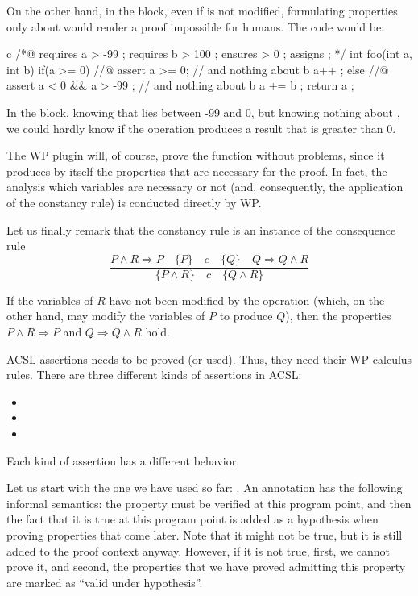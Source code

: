 On the other hand, in the  block, even if  is
not modified, formulating properties only about  would render
a proof impossible for humans. The code would be:



\begin{CodeBlock}{c}
/*@
  requires a > -99 ;
  requires b > 100 ;
  ensures  \result > 0 ;
  assigns  \nothing ;
*/
int foo(int a, int b){
  if(a >= 0){
    //@ assert a >= 0; // and nothing about b
    a++ ;
  } else {
    //@ assert a < 0 && a > -99 ; // and nothing about b
    a += b ;
  }
  return a ;
}
\end{CodeBlock}



In the  block, knowing that lies between -99 and
0, but knowing nothing about , we could hardly know if the
operation  produces a result that is greater than 0.

The WP plugin will, of course, prove the function without problems,
since it produces by itself the properties that are necessary for the
proof. In fact, the analysis which variables are necessary or not (and,
consequently, the application of the constancy rule) is conducted
directly by WP.

Let us finally remark that the constancy rule is an instance of the
consequence rule
$$\dfrac{P \wedge R \Rightarrow P \quad \{P\}\quad c\quad \{Q\} \quad Q \Rightarrow Q \wedge R}{\{P \wedge R\}\quad c\quad \{Q \wedge R\}}$$


If the variables of $R$ have not been modified by the operation
(which, on the other hand, may modify the variables of $P$ to produce
$Q$), then the properties $P \wedge R \Rightarrow P$ and
$Q \Rightarrow Q \wedge R$ hold.




ACSL assertions needs to be proved (or used). Thus, they need their WP calculus
rules. There are three different kinds of assertions in ACSL:
\begin{itemize}
  \item {}
  \item {}
  \item {}
\end{itemize}


Each kind of assertion has a different behavior.


Let us start with the one we have used so far: . An
annotation  has the following informal semantics: the
property  must be verified at this program point, and then the
fact that it is true at this program point is added as a hypothesis when proving
properties that come later. Note that it might not be true, but it is still
added to the proof context anyway. However, if it is not true, first, we cannot
prove it, and second, the properties that we have proved admitting this
property are marked as ``valid under hypothesis''.


